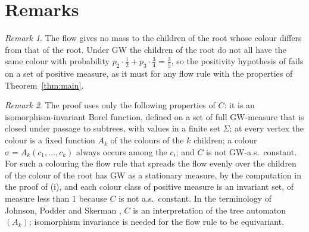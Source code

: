 \documentclass[11pt]{amsart}
\theoremstyle{remark}
\newtheorem{remark}{Remark}
\numberwithin{equation}{section}
\newcommand{\GW}{\mathrm{GW}}
\begin{document}
\section{Remarks}\label{sec:remarks}

\begin{remark}\label{rem:positive}
The flow gives no mass to the children of the root whose colour differs from that of the root. Under $\GW$ the children of the root do not all have the same colour with probability $p_2\cdot\frac12+p_3\cdot\frac34=\frac35$, so the positivity hypothesis of \cite[Proposition~17.17]{LP} fails on a set of positive measure, as it must for any flow rule with the properties of Theorem~\ref{thm:main}.
\end{remark}

\begin{remark}\label{rem:general}
The proof uses only the following properties of $C$: it is an isomorphism-invariant Borel function, defined on a set of full $\GW$-measure that is closed under passage to subtrees, with values in a finite set $\Sigma$; at every vertex the colour is a fixed function $A_k$ of the colours of the $k$ children; a colour $\sigma=A_k(c_1,\dots,c_k)$ always occurs among the $c_i$; and $C$ is not $\GW$-a.s.\ constant. For such a colouring the flow rule that spreads the flow evenly over the children of the colour of the root has $\GW$ as a stationary measure, by the computation in the proof of (i), and each colour class of positive measure is an invariant set, of measure less than $1$ because $C$ is not a.s.\ constant. In the terminology of Johnson, Podder and Skerman \cite{JPS}, $C$ is an interpretation of the tree automaton $(A_k)$; isomorphism invariance is needed for the flow rule to be equivariant.
\end{remark}
\end{document}
